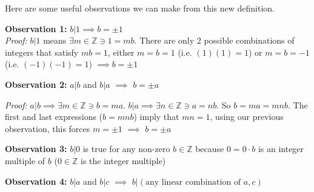 
\noindent Here are some useful observations we can make from this new definition.\steezybreak

\noindent\textbf{Observation 1:} $b|1\implies b=\pm 1$\\
\textit{Proof:} $b|1$ means $\exists m\in \mathbb{Z}\ni 1=mb$. There are only 2 possible
combinations of integers that satisfy $mb=1$, either $m=b=1$ (i.e. $(1)(1)=1$) or $m=b=-1$ (i.e.
$(-1)(-1)=1$) $\implies b=\pm 1$ \steezybreak

\noindent\textbf{Observation 2:} $a|b$ and $b|a$ $\implies$ $b=\pm a$ \steezybreak

\noindent \textit{Proof:} $a|b \implies \exists m \in \mathbb{Z} \ni b= ma$.
$b|a \implies \exists n \in \mathbb{Z} \ni a= nb$. So $b=ma=mnb$. The first and last expressions
($b=mnb$) imply that $mn=1$, using our previous observation, this forces $m=\pm 1$ $\implies$
$b=\pm a$\steezybreak

\noindent\textbf{Observation 3:} $b|0$ is true for any non-zero $b\in \mathbb{Z}$ because
$0=0\cdot b$ is an integer multiple of $b$ ($0\in \mathbb{Z}$ is the integer multiple)\steezybreak

\noindent\textbf{Observation 4:}  $b|a$ and $b|c$ $\implies$
$b|(\text{any linear combination of }a,c)$ \steezybreak


